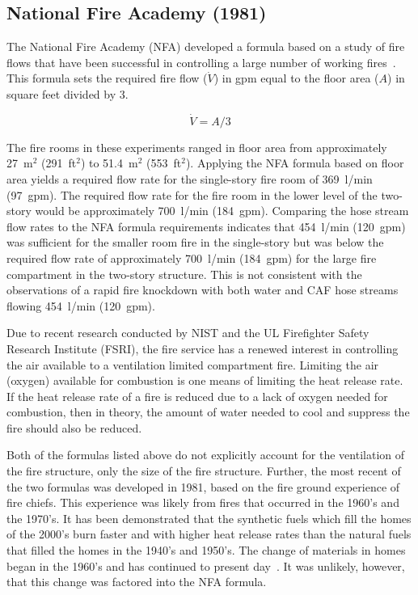 \documentclass[12pt,oneside]{book}
\begin{document}
\subsection{National Fire Academy (1981)}
The National Fire Academy (NFA) developed a formula based on a study of fire flows that have been successful in controlling a large number of working fires~\cite{Klaene:1}. This formula sets the required fire flow ($\dot{V}$) in gpm equal to the floor area ($A$) in square feet divided by 3.

\begin{equation}\label{eq:nfa_form}
\dot{V} = A / 3
\end{equation}

The fire rooms in these experiments ranged in floor area from approximately 27~m$^2$ (291~ft$^2$) to 51.4~m$^2$ (553~ft$^2$). Applying the NFA formula based on floor area yields a required flow rate for the single-story fire room of 369~l/min (97~gpm). The required flow rate for the fire room in the lower level of the two-story would be approximately 700~l/min (184~gpm). Comparing the hose stream flow rates to the NFA formula requirements indicates that 454~l/min (120~gpm) was sufficient for the smaller room fire in the single-story but was below the required flow rate of approximately 700~l/min (184~gpm) for the large fire compartment in the two-story structure. This is not consistent with the observations of a rapid fire knockdown with both water and CAF hose streams flowing 454~l/min (120~gpm). 

Due to recent research conducted by NIST and the UL Firefighter Safety Research Institute (FSRI), the fire service has a renewed interest in controlling the air available to a ventilation limited compartment fire. Limiting the air (oxygen) available for combustion is one means of limiting the heat release rate. If the heat release rate of a fire is reduced due to a lack of oxygen needed for combustion, then in theory, the amount of water needed to cool and suppress the fire should also be reduced.    

Both of the formulas listed above do not explicitly account for the ventilation of the fire structure, only the size of the fire structure. Further, the most recent of the two formulas was developed in 1981, based on the fire ground experience of fire chiefs. This experience was likely from fires that occurred in the 1960's and the 1970's. It has been demonstrated that the synthetic fuels which fill the homes of the 2000's burn faster and with higher heat release rates than the natural fuels that filled the homes in the 1940's and 1950's. The change of materials in homes began in the 1960's and has continued to present day~\cite{Kerber:2}. It was unlikely, however, that this change was factored into the NFA formula.   
\end{document}
